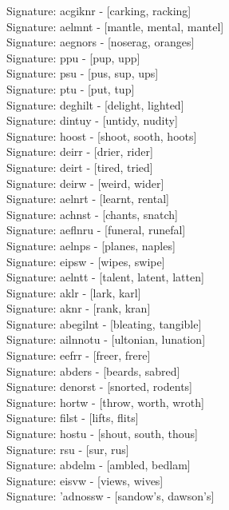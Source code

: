 Signature: {acgiknr} - [carking, racking] \\
Signature: {aelmnt} - [mantle, mental, mantel] \\
Signature: {aegnors} - [noserag, oranges] \\
Signature: {ppu} - [pup, upp] \\
Signature: {psu} - [pus, sup, ups] \\
Signature: {ptu} - [put, tup] \\
Signature: {deghilt} - [delight, lighted] \\
Signature: {dintuy} - [untidy, nudity] \\
Signature: {hoost} - [shoot, sooth, hoots] \\
Signature: {deirr} - [drier, rider] \\
Signature: {deirt} - [tired, tried] \\
Signature: {deirw} - [weird, wider] \\
Signature: {aelnrt} - [learnt, rental] \\
Signature: {achnst} - [chants, snatch] \\
Signature: {aeflnru} - [funeral, runefal] \\
Signature: {aelnps} - [planes, naples] \\
Signature: {eipsw} - [wipes, swipe] \\
Signature: {aelntt} - [talent, latent, latten] \\
Signature: {aklr} - [lark, karl] \\
Signature: {aknr} - [rank, kran] \\
Signature: {abegilnt} - [bleating, tangible] \\
Signature: {ailnnotu} - [ultonian, lunation] \\
Signature: {eefrr} - [freer, frere] \\
Signature: {abders} - [beards, sabred] \\
Signature: {denorst} - [snorted, rodents] \\
Signature: {hortw} - [throw, worth, wroth] \\
Signature: {filst} - [lifts, flits] \\
Signature: {hostu} - [shout, south, thous] \\
Signature: {rsu} - [sur, rus] \\
Signature: {abdelm} - [ambled, bedlam] \\
Signature: {eisvw} - [views, wives] \\
Signature: {'adnossw} - [sandow's, dawson's] \\
